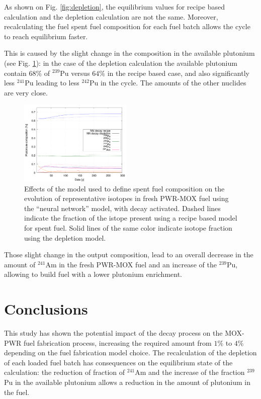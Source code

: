 \documentclass{anstrans}
\begin{document}
As shown on Fig. \ref{fig:depletion}, the equilibrium values for recipe based
calculation and the depletion calculation are not the same. Moreover,
recalculating the fuel spent fuel composition for each fuel batch allows the
cycle to reach equilibrium faster.

This is caused by the slight change in the composition in the available plutonium
(see Fig. \ref{fig:depletioncompo}): in the case of the depletion calculation
the available plutonium contain $68\%$ of $^{239}$Pu versus $64\%$ in the recipe
based case, and also significantly less $^{241}$Pu leading to less $^{242}$Pu in
the cycle. The amounts of the other nuclides are very close.

\begin{figure}[ht] %
  \centering
  \includegraphics[width=0.48\textwidth]{MOX_pu_composition.png}
  \caption{Effects of the model used to define spent fuel composition on the evolution of representative isotopes in fresh PWR-MOX fuel
    using the ``neural network'' model, with decay activated. Dashed lines indicate the fraction of the
    istope present using a recipe based model for spent fuel. Solid lines of the same color indicate isotope fraction using the depletion model.}

  \label{fig:depletioncompo}
\end{figure}

Those slight change in the output composition, lead to an overall decrease in
the amount of $^{241}$Am in the fresh PWR-MOX fuel and an increase of the
$^{239}$Pu, allowing to build fuel with a lower plutonium enrichment.


\section{Conclusions}

This study has shown the potential impact of the decay process on the MOX-PWR fuel
fabrication process, increasing the required amount from $1\%$ to $4\%$
depending on the fuel fabrication model choice. The recalculation of the 
depletion of each loaded fuel batch has consequences on the equilibrium
state of the calculation: the reduction of fraction of $^{241}$Am and the increase of the
fraction $^{239}$Pu in the available plutonium allows a reduction in the amount of
plutonium in the fuel.
\end{document}
